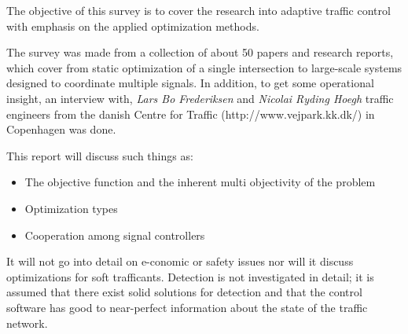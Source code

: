 \label{scope}
The objective of this survey is to cover the research into adaptive traffic control with emphasis on the applied optimization methods.

The survey was made from a collection of about 50 papers and research reports, which cover from static optimization of a single intersection to large-scale systems designed to coordinate multiple signals. In addition, to get some operational insight, an interview with, \textit{Lars Bo Frederiksen} and \textit{Nicolai Ryding Hoegh} traffic engineers from the danish Centre for Traffic (http://www.vejpark.kk.dk/) in Copenhagen was done.

This report will discuss such things as:

\begin{itemize}
\item The objective function and the inherent multi objectivity of the problem
\item Optimization types
\item Cooperation among signal controllers
\end{itemize}

It will not go into detail on e-conomic or safety issues nor will it discuss optimizations for soft trafficants. Detection is not investigated in detail; it is assumed that there exist solid solutions for detection and that the control software has good to near-perfect information about the state of the traffic network.
